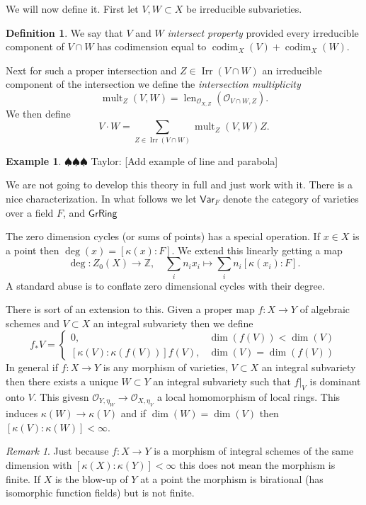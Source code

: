 \documentclass[12pt]{article}
\numberwithin{equation}{section}
\theoremstyle{definition}
\newtheorem{definition}[theorem]{Definition}
\newtheorem{example}[theorem]{Example}
\theoremstyle{remark}
\newtheorem{remark}[theorem]{Remark}
\newcommand{\ZZ}{\mathbb{Z}}
\newcommand{\Ocal}{\mathcal{O}}
\newcommand{\Var}{\mathsf{Var}}
\newcommand{\GrRing}{\mathsf{GrRing}}
\newcommand{\codim}{\operatorname{codim}}
\newcommand{\mult}{\operatorname{mult}}
\newcommand{\len}{\operatorname{len}}
\newcommand{\Irr}{\operatorname{Irr}}
\newcommand{\taylor}[1]{{\color{blue} \sf $\spadesuit\spadesuit\spadesuit$ Taylor: [#1]}}
\begin{document}
We will now define it. First let $V,W\subset X$ be irreducible subvarieties. 
\begin{definition}
We say that $V$ and $W$ \emph{intersect property} provided every irreducible component of $V\cap W$ has codimension equal to $\codim_X(V)+\codim_X(W)$. 
\end{definition}

Next for such a proper intersection and $Z\in \Irr(V\cap W)$ an irreducible component of the intersection we define the \emph{intersection multiplicity}
 $$ \mult_Z(V,W) = \len_{\Ocal_{X,Z}}(\Ocal_{V\cap W,Z}). $$
We then define 
 $$ V \cdot W = \sum_{Z \in \Irr(V\cap W) } \mult_Z(V,W) Z. $$ 

\begin{example}
\taylor{Add example of line and parabola}	
\end{example}
 
We are not going to develop this theory in full and just work with it.
There is a nice characterization.
In what follows we let $\Var_F$ denote the category of varieties over a field $F$, and $\GrRing$ 

The zero dimension cycles (or sums of points) has a special operation. 
If $x\in X$ is a point then $\deg(x) = [\kappa(x):F]$. We extend this linearly getting a map 
 $$ \deg:Z_0(X) \to \ZZ, \quad \sum_{i} n_i x_i \mapsto \sum_i n_i [\kappa(x_i):F]. $$
A standard abuse is to conflate zero dimensional cycles with their degree.  

There is sort of an extension to this. 
Given a proper map $f:X\to Y$ of algebraic schemes and $V\subset X$ an integral subvariety then we define  
 $$ f_*V= \begin{cases}
 0, & \dim(f(V)) < \dim(V) \\
 [\kappa(V):\kappa(f(V))]  f(V), & \dim(V) = \dim(f(V))
 \end{cases}$$
In general if $f:X \to Y$ is any morphism of varieties, $V\subset X$ an integral subvariety then there exists a unique $W \subset Y$ an integral subvariety such that $f\vert_V$ is dominant onto $V$. 
This givesn $\Ocal_{Y,\eta_W} \to \Ocal_{X,\eta_V}$ a local homomorphism of local rings.
This induces $\kappa(W) \to \kappa(V)$ and if $\dim(W)=\dim(V)$ then $[\kappa(V):\kappa(W)]<\infty$.

\begin{remark}
	Just because $f:X\to Y$ is a morphism of integral schemes of the same dimension with $[\kappa(X):\kappa(Y)]<\infty$ this does not mean the morphism is finite. 
	If $X$ is the blow-up of $Y$ at a point the morphism is birational (has isomorphic function fields) but is not finite. 
\end{remark}
\end{document}
